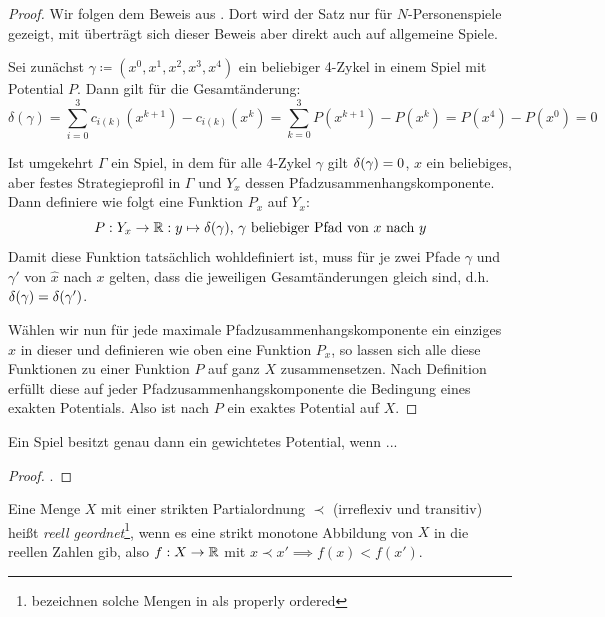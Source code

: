 \begin{proof}
	Wir folgen dem Beweis aus \cite[Anhang A]{MonShap}. Dort wird der Satz nur für $N$-Personenspiele gezeigt, mit  überträgt sich dieser Beweis aber direkt auch auf allgemeine Spiele.
	
	Sei zunächst $\gamma \coloneqq (x^0, x^1, x^2, x^3, x^4)$ ein beliebiger 4-Zykel in einem Spiel mit Potential $P$. Dann gilt für die Gesamtänderung:
		\[\delta(\gamma) = \sum_{i=0}^3 c_{i(k)}(x^{k+1}) - c_{i(k)}(x^k) = \sum_{k=0}^{3} P(x^{k+1}) - P(x^k) = P(x^4) - P(x^0) = 0^{}\]
		
	Ist umgekehrt $\Gamma$ ein Spiel, in dem für alle 4-Zykel $\gamma$ gilt $\delta(\gamma) = 0$, $x$ ein beliebiges, aber festes Strategieprofil in $\Gamma$ und $Y_x$ dessen Pfadzusammenhangskomponente. Dann definiere wie folgt eine Funktion $P_x$ auf $Y_x$:
		\[P: Y_x \to \mathbb{R}: y \mapsto \delta(\gamma), \,\gamma \text{ beliebiger Pfad von } x \text{ nach } y \]
	Damit diese Funktion tatsächlich wohldefiniert ist, muss für je zwei Pfade $\gamma$ und $\gamma'$ von $\hat{x}$ nach $x$ gelten, dass die jeweiligen Gesamtänderungen gleich sind, d.h. $\delta(\gamma) = \delta(\gamma')$. 
	
	Wählen wir nun für jede maximale Pfadzusammenhangskomponente ein einziges $x$ in dieser und definieren wie oben eine Funktion $P_x$, so lassen sich alle diese Funktionen zu einer Funktion $P$ auf ganz $X$ zusammensetzen. Nach Definition erfüllt diese auf jeder Pfadzusammenhangskomponente die Bedingung eines exakten Potentials. Also ist nach  $P$ ein exaktes Potential auf $X$.
\end{proof}

\begin{satz}\label{satz:CharGewPot}
	Ein Spiel besitzt genau dann ein gewichtetes Potential, wenn ... 
\end{satz}

\begin{proof}.
	
\end{proof}


\begin{defn}
	Eine Menge $X$ mit einer strikten Partialordnung $\prec$ (irreflexiv und transitiv) heißt \emph{reell geordnet}\footnote{\citeauthor{CharExOrdPot} bezeichnen solche Mengen in \cite{CharExOrdPot} als \glqq properly ordered\grqq}, wenn es eine strikt monotone Abbildung von $X$ in die reellen Zahlen gib, also $f: X \to \mathbb{R}$ mit $x \prec x' \implies f(x) < f(x')$.
\end{defn}

